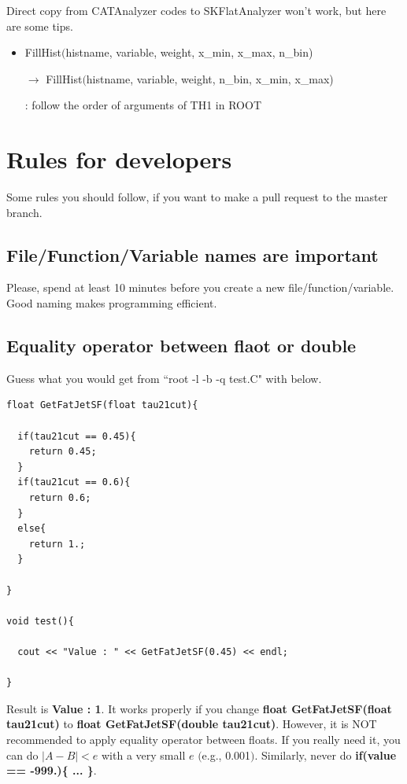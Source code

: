 \documentclass[12pt, a4paper, titlepage]{article}
\begin{document}
Direct copy from CATAnalyzer codes to SKFlatAnalyzer won't work, but here are some tips.

\begin{itemize}

\item FillHist$($histname, variable, weight, x\_min, x\_max, n\_bin) \par
      $\rightarrow$ FillHist$($histname, variable, weight, n\_bin, x\_min, x\_max) \par
      : follow the order of arguments of TH1 in ROOT

\end{itemize}

\clearpage

\section{Rules for developers}

Some rules you should follow, if you want to make a pull request to the master branch.

\subsection{File/Function/Variable names are important}

Please, spend at least 10 minutes before you create a new file/function/variable.
Good naming makes programming efficient.

\subsection{Equality operator between flaot or double}

Guess what you would get from ``root -l -b -q test.C" with below.

\begin{lstlisting}
float GetFatJetSF(float tau21cut){
  
  if(tau21cut == 0.45){
    return 0.45;
  }
  if(tau21cut == 0.6){
    return 0.6;
  }
  else{
    return 1.;
  }

}

void test(){

  cout << "Value : " << GetFatJetSF(0.45) << endl;

}

\end{lstlisting}

Result is \textbf{Value : 1}.
It works properly if you change \textbf{float GetFatJetSF(float tau21cut)} to \textbf{float GetFatJetSF(double tau21cut)}.
However, it is NOT recommended to apply equality operator between floats.
If you really need it, you can do $|A-B|<e$ with a very small $e$ $($e.g., 0.001$)$.
Similarly, never do \textbf{if(value == -999.)\{ ... \}}.
\end{document}

